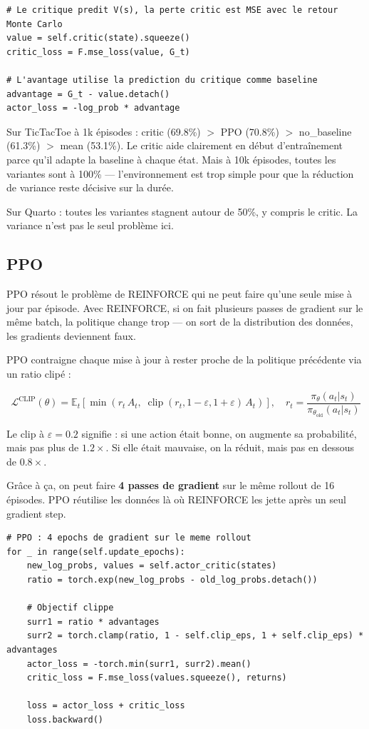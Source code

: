 \documentclass[12pt,a4paper]{article}
\begin{document}
\begin{lstlisting}
# Le critique predit V(s), la perte critic est MSE avec le retour Monte Carlo
value = self.critic(state).squeeze()
critic_loss = F.mse_loss(value, G_t)

# L'avantage utilise la prediction du critique comme baseline
advantage = G_t - value.detach()
actor_loss = -log_prob * advantage
\end{lstlisting}

\begin{observationbox}
Sur TicTacToe à 1k épisodes : critic (69.8\%) $>$ PPO (70.8\%) $>$ no\_baseline (61.3\%) $>$ mean (53.1\%). Le critic aide clairement en début d'entraînement parce qu'il adapte la baseline à chaque état. Mais à 10k épisodes, toutes les variantes sont à 100\% — l'environnement est trop simple pour que la réduction de variance reste décisive sur la durée.

Sur Quarto : toutes les variantes stagnent autour de 50\%, y compris le critic. La variance n'est pas le seul problème ici.
\end{observationbox}

\subsection{PPO}

PPO résout le problème de REINFORCE qui ne peut faire qu'une seule mise à jour par épisode. Avec REINFORCE, si on fait plusieurs passes de gradient sur le même batch, la politique change trop — on sort de la distribution des données, les gradients deviennent faux.

PPO contraigne chaque mise à jour à rester proche de la politique précédente via un ratio clipé :

\[
\mathcal{L}^{\text{CLIP}}(\theta) = \mathbb{E}_t\!\left[\min\!\left(r_t\,A_t,\;\operatorname{clip}(r_t, 1-\varepsilon, 1+\varepsilon)\,A_t\right)\right], \quad r_t = \frac{\pi_\theta(a_t|s_t)}{\pi_{\theta_\text{old}}(a_t|s_t)}
\]

Le clip à $\varepsilon = 0.2$ signifie : si une action était bonne, on augmente sa probabilité, mais pas plus de $1.2\times$. Si elle était mauvaise, on la réduit, mais pas en dessous de $0.8\times$.

Grâce à ça, on peut faire \textbf{4 passes de gradient} sur le même rollout de 16 épisodes. PPO réutilise les données là où REINFORCE les jette après un seul gradient step.

\begin{lstlisting}
# PPO : 4 epochs de gradient sur le meme rollout
for _ in range(self.update_epochs):
    new_log_probs, values = self.actor_critic(states)
    ratio = torch.exp(new_log_probs - old_log_probs.detach())

    # Objectif clippe
    surr1 = ratio * advantages
    surr2 = torch.clamp(ratio, 1 - self.clip_eps, 1 + self.clip_eps) * advantages
    actor_loss = -torch.min(surr1, surr2).mean()
    critic_loss = F.mse_loss(values.squeeze(), returns)

    loss = actor_loss + critic_loss
    loss.backward()
\end{lstlisting}
\end{document}

